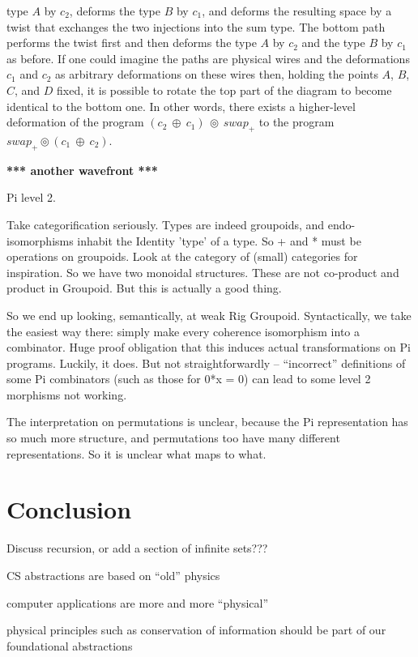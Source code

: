\documentclass{article}
\newcommand{\amr}[1]{\fbox{Amr says:} \textbf{#1}}
\begin{document}
type $A$ by $c_2$, deforms the type $B$ by $c_1$, and deforms the
resulting space by a twist that exchanges the two injections into the
sum type. The bottom path performs the twist first and then deforms
the type $A$ by $c_2$ and the type $B$ by $c_1$ as before. If one
could imagine the paths are physical wires and the deformations $c_1$
and $c_2$ as arbitrary deformations on these wires then, holding the
points $A$, $B$, $C$, and $D$ fixed, it is possible to rotate the top
part of the diagram to become identical to the bottom one. In other
words, there exists a higher-level deformation of the program
$(c_2~\oplus~c_1)~\circledcirc~\mathit{swap}_{+}$ to the program
$\mathit{swap}_{+} \circledcirc (c_1~\oplus~c_2)$.

\amr{*** another wavefront ***}


Pi level 2.

Take categorification seriously. Types are indeed groupoids, and
endo-isomorphisms inhabit the Identity 'type' of a type. So + and *
must be operations on groupoids. Look at the category of (small)
categories for inspiration. So we have two monoidal structures.
These are not co-product and product in Groupoid. But this is actually
a good thing.

So we end up looking, semantically, at weak Rig Groupoid. Syntactically,
we take the easiest way there: simply make every coherence isomorphism into
a combinator. Huge proof obligation that this induces actual transformations
on Pi programs. Luckily, it does.  But not straightforwardly -- ``incorrect''
definitions of some Pi combinators (such as those for 0*x = 0) can lead to
some level 2 morphisms not working. 

The interpretation on permutations is unclear, because the Pi representation
has so much more structure, and permutations too have many different 
representations. So it is unclear what maps to what.

\section{Conclusion}

Discuss recursion, or add a section of infinite sets???

CS abstractions are based on ``old'' physics

computer applications are more and more ``physical''

physical principles such as conservation of information should be part
of our foundational abstractions
\end{document}
